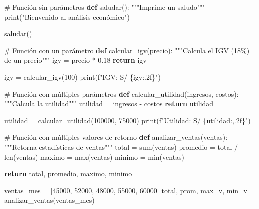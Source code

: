 \documentclass[
  doc,
  floatsintext,
  longtable,
  a4paper,
  nolmodern,
  notxfonts,
  notimes,
  12pt,
  colorlinks=true,linkcolor=blue,citecolor=blue,urlcolor=blue]{apa7}
\newenvironment{Shaded}{\begin{snugshade}}{\end{snugshade}}
\newcommand{\BuiltInTok}[1]{\textcolor[rgb]{0.00,0.23,0.31}{#1}}
\newcommand{\CommentTok}[1]{\textcolor[rgb]{0.37,0.37,0.37}{#1}}
\newcommand{\ControlFlowTok}[1]{\textcolor[rgb]{0.00,0.23,0.31}{\textbf{#1}}}
\newcommand{\DecValTok}[1]{\textcolor[rgb]{0.68,0.00,0.00}{#1}}
\newcommand{\FloatTok}[1]{\textcolor[rgb]{0.68,0.00,0.00}{#1}}
\newcommand{\KeywordTok}[1]{\textcolor[rgb]{0.00,0.23,0.31}{\textbf{#1}}}
\newcommand{\NormalTok}[1]{\textcolor[rgb]{0.00,0.23,0.31}{#1}}
\newcommand{\OperatorTok}[1]{\textcolor[rgb]{0.37,0.37,0.37}{#1}}
\newcommand{\SpecialCharTok}[1]{\textcolor[rgb]{0.37,0.37,0.37}{#1}}
\newcommand{\SpecialStringTok}[1]{\textcolor[rgb]{0.13,0.47,0.30}{#1}}
\newcommand{\StringTok}[1]{\textcolor[rgb]{0.13,0.47,0.30}{#1}}
\begin{document}
\begin{Shaded}
\begin{Highlighting}[]
\CommentTok{\# Función sin parámetros}
\KeywordTok{def}\NormalTok{ saludar():}
    \CommentTok{"""Imprime un saludo"""}
    \BuiltInTok{print}\NormalTok{(}\StringTok{"Bienvenido al análisis económico"}\NormalTok{)}

\NormalTok{saludar()}

\CommentTok{\# Función con un parámetro}
\KeywordTok{def}\NormalTok{ calcular\_igv(precio):}
    \CommentTok{"""Calcula el IGV (18\%) de un precio"""}
\NormalTok{    igv }\OperatorTok{=}\NormalTok{ precio }\OperatorTok{*} \FloatTok{0.18}
    \ControlFlowTok{return}\NormalTok{ igv}

\NormalTok{igv }\OperatorTok{=}\NormalTok{ calcular\_igv(}\DecValTok{100}\NormalTok{)}
\BuiltInTok{print}\NormalTok{(}\SpecialStringTok{f"IGV: S/ }\SpecialCharTok{\{}\NormalTok{igv}\SpecialCharTok{:.2f\}}\SpecialStringTok{"}\NormalTok{)}

\CommentTok{\# Función con múltiples parámetros}
\KeywordTok{def}\NormalTok{ calcular\_utilidad(ingresos, costos):}
    \CommentTok{"""Calcula la utilidad"""}
\NormalTok{    utilidad }\OperatorTok{=}\NormalTok{ ingresos }\OperatorTok{{-}}\NormalTok{ costos}
    \ControlFlowTok{return}\NormalTok{ utilidad}

\NormalTok{utilidad }\OperatorTok{=}\NormalTok{ calcular\_utilidad(}\DecValTok{100000}\NormalTok{, }\DecValTok{75000}\NormalTok{)}
\BuiltInTok{print}\NormalTok{(}\SpecialStringTok{f"Utilidad: S/ }\SpecialCharTok{\{}\NormalTok{utilidad}\SpecialCharTok{:,.2f\}}\SpecialStringTok{"}\NormalTok{)}

\CommentTok{\# Función con múltiples valores de retorno}
\KeywordTok{def}\NormalTok{ analizar\_ventas(ventas):}
    \CommentTok{"""Retorna estadísticas de ventas"""}
\NormalTok{    total }\OperatorTok{=} \BuiltInTok{sum}\NormalTok{(ventas)}
\NormalTok{    promedio }\OperatorTok{=}\NormalTok{ total }\OperatorTok{/} \BuiltInTok{len}\NormalTok{(ventas)}
\NormalTok{    maximo }\OperatorTok{=} \BuiltInTok{max}\NormalTok{(ventas)}
\NormalTok{    minimo }\OperatorTok{=} \BuiltInTok{min}\NormalTok{(ventas)}
    
    \ControlFlowTok{return}\NormalTok{ total, promedio, maximo, minimo}

\NormalTok{ventas\_mes }\OperatorTok{=}\NormalTok{ [}\DecValTok{45000}\NormalTok{, }\DecValTok{52000}\NormalTok{, }\DecValTok{48000}\NormalTok{, }\DecValTok{55000}\NormalTok{, }\DecValTok{60000}\NormalTok{]}
\NormalTok{total, prom, max\_v, min\_v }\OperatorTok{=}\NormalTok{ analizar\_ventas(ventas\_mes)}


\end{Highlighting}
\end{Shaded}
\end{document}
